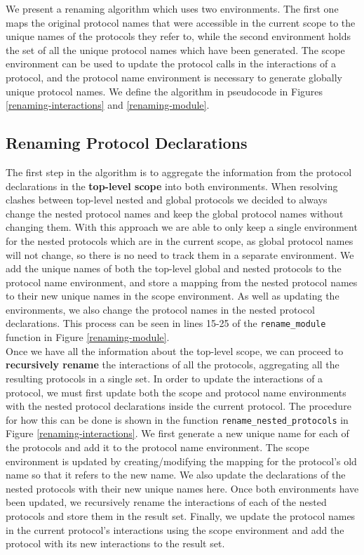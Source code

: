 \documentclass[12pt,twoside]{report}
\begin{document}
We present a renaming algorithm which uses two environments. The first one maps the original protocol names that were accessible in the current scope to the unique names of the protocols they refer to, while the second environment holds the set of all the unique protocol names which have been generated. The scope environment can be used to update the protocol calls in the interactions of a protocol, and the protocol name environment is necessary to generate globally unique protocol names. We define the algorithm in pseudocode in Figures \ref{renaming-interactions} and \ref{renaming-module}.

\subsection{Renaming Protocol Declarations}

The first step in the algorithm is to aggregate the information from the protocol declarations in the \textbf{top-level scope} into both environments. When resolving clashes between top-level nested and global protocols we decided to always change the nested protocol names and keep the global protocol names without changing them. With this approach we are able to only keep a single environment for the nested protocols which are in the current scope, as global protocol names will not change, so there is no need to track them in a separate environment. We add the unique names of both the top-level global and nested protocols to the protocol name environment, and store a mapping from the nested protocol names to their new unique names in the scope environment. As well as updating the environments, we also change the protocol names in the nested protocol declarations. This process can be seen in lines 15-25 of the \texttt{rename\_module} function in Figure \ref{renaming-module}.\\

Once we have all the information about the top-level scope, we can proceed to \textbf{recursively rename} the interactions of all the protocols, aggregating all the resulting protocols in a single set. In order to update the interactions of a protocol, we must first update both the scope and protocol name environments with the nested protocol declarations inside the current protocol. The procedure for how this can be done is shown in the function \texttt{rename\_nested\_protocols} in Figure \ref{renaming-interactions}. We first generate a new unique name for each of the protocols and add it to the protocol name environment. The scope environment is updated by creating/modifying the mapping for the protocol's old name so that it refers to the new name. We also update the declarations of the nested protocols with their new unique names here. Once both environments have been updated, we recursively rename the interactions of each of the nested protocols and store them in the result set. Finally, we update the protocol names in the current protocol's interactions using the scope environment and add the protocol with its new interactions to the result set.
 
\end{document}
